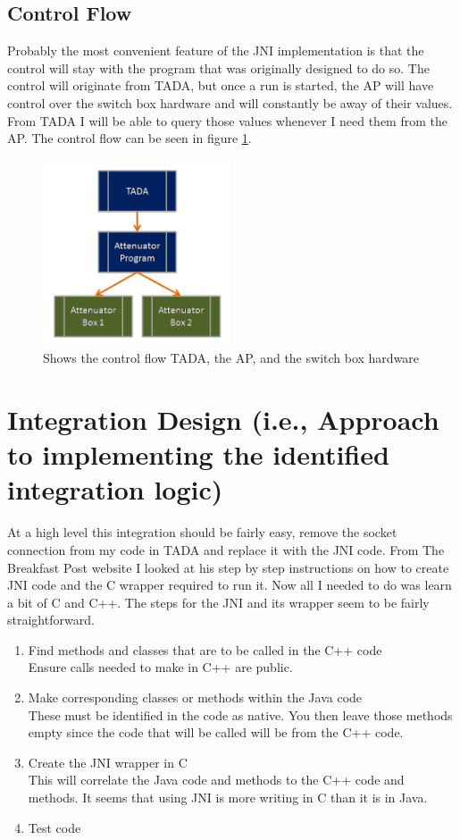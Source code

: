 \documentclass [a4paper,12pt,oneside,final,titlepage]{article}
\begin{document}
	\subsection{Control Flow}
Probably the most convenient feature of the JNI implementation is that the control will stay with the program that was originally designed to do so. The control will originate from TADA, but once a run is started, the AP will have control over the switch box hardware and will constantly be away of their values. From TADA I will be able to query those values whenever I need them from the AP. The control flow can be seen in figure \ref{fig:control}.
	\begin{figure}[htp]
		\centering
		\includegraphics[height=55mm]{controlFlow}
		\caption{Shows the control flow TADA, the AP, and the switch box hardware}
		\label{fig:control}
	\end{figure}

	\section{Integration Design (i.e., Approach to implementing the identified integration logic)}
	At a high level this integration should be fairly easy, remove the socket connection from my code in TADA and replace it with the JNI code. From The Breakfast Post website \cite{jniWebsite} I looked at his step by step instructions on how to create JNI code and the C wrapper required to run it. Now all I needed to do was learn a bit of C and C++. The steps for the JNI and its wrapper seem to be fairly straightforward. 
\begin{enumerate}
	\item Find methods and classes that are to be called in the C++ code\\
Ensure calls needed to make in C++ are public.
	\item Make corresponding classes or methods within the Java code \\
These must be identified in the code as native. You then leave those methods empty since the code that will be called will be from the C++ code.
	\item Create the JNI wrapper in C \\
This will correlate the Java code and methods to the C++ code and methods. It seems that using JNI is more writing in C than it is in Java.
	\item Test code
\end{enumerate}
\end{document}
